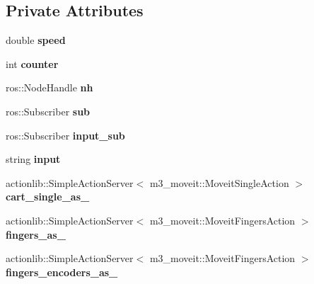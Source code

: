 \subsection*{Private Attributes}
\begin{DoxyCompactItemize}
\item 
\mbox{\label{classM3MoveGroup_a2de02d08a1143bc922b9c6064390feec}} 
double {\bfseries speed}
\item 
\mbox{\label{classM3MoveGroup_af48585e7365e3f074da979dd9a9f5ec6}} 
int {\bfseries counter}
\item 
\mbox{\label{classM3MoveGroup_ae1027e3ba7e32e7d484a41bc21ca9f33}} 
ros\+::\+Node\+Handle {\bfseries nh}
\item 
\mbox{\label{classM3MoveGroup_aae8528cc0600cff3dc0c6379dd024475}} 
ros\+::\+Subscriber {\bfseries sub}
\item 
\mbox{\label{classM3MoveGroup_a242c957ef30ddaa0603eea58183c77f1}} 
ros\+::\+Subscriber {\bfseries input\+\_\+sub}
\item 
\mbox{\label{classM3MoveGroup_a21f6ef43a6a977e44417edf695bb9e51}} 
string {\bfseries input}
\item 
\mbox{\label{classM3MoveGroup_a35aa642a8075093804905a6a2ba53bf4}} 
actionlib\+::\+Simple\+Action\+Server$<$ m3\+\_\+moveit\+::\+Moveit\+Single\+Action $>$ {\bfseries cart\+\_\+single\+\_\+as\+\_\+}
\item 
\mbox{\label{classM3MoveGroup_a45220388a7610bdced386b9f72634664}} 
actionlib\+::\+Simple\+Action\+Server$<$ m3\+\_\+moveit\+::\+Moveit\+Fingers\+Action $>$ {\bfseries fingers\+\_\+as\+\_\+}
\item 
\mbox{\label{classM3MoveGroup_a9488a0b143372a7fcb9183a0e0077f0b}} 
actionlib\+::\+Simple\+Action\+Server$<$ m3\+\_\+moveit\+::\+Moveit\+Fingers\+Action $>$ {\bfseries fingers\+\_\+encoders\+\_\+as\+\_\+}
\item 
\mbox{\label{classM3MoveGroup_a4e85f645b84b284722ff2161b4c09a53}} 

\end{DoxyCompactItemize}
